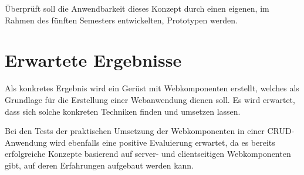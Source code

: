 Überprüft soll die Anwendbarkeit dieses Konzept durch einen eigenen, im Rahmen des fünften Semesters entwickelten, Prototypen werden.

\section{Erwartete Ergebnisse}

Als konkretes Ergebnis wird ein Gerüst mit Webkomponenten erstellt, welches als Grundlage für die Erstellung einer Webanwendung dienen soll. Es wird erwartet, dass sich solche konkreten Techniken finden und umsetzen lassen.

Bei den Tests der praktischen Umsetzung der Webkomponenten in einer CRUD-Anwendung wird ebenfalls eine positive Evaluierung erwartet, da es bereits erfolgreiche Konzepte basierend auf server- und clientseitigen Webkomponenten gibt, auf deren Erfahrungen aufgebaut werden kann.
